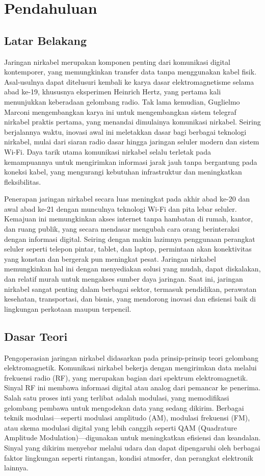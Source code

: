 \section{Pendahuluan}
\subsection{Latar Belakang}
Jaringan nirkabel merupakan komponen penting dari komunikasi 
digital kontemporer, yang memungkinkan transfer data tanpa 
menggunakan kabel fisik. Asal-usulnya dapat ditelusuri kembali 
ke karya dasar elektromagnetisme selama abad ke-19, khususnya 
eksperimen Heinrich Hertz, yang pertama kali menunjukkan 
keberadaan gelombang radio. Tak lama kemudian, Guglielmo Marconi 
mengembangkan karya ini untuk mengembangkan sistem telegraf 
nirkabel praktis pertama, yang menandai dimulainya komunikasi 
nirkabel. Seiring berjalannya waktu, inovasi awal ini meletakkan 
dasar bagi berbagai teknologi nirkabel, mulai dari siaran radio 
dasar hingga jaringan seluler modern dan sistem Wi-Fi. 
Daya tarik utama komunikasi nirkabel selalu terletak pada 
kemampuannya untuk mengirimkan informasi jarak jauh tanpa 
bergantung pada koneksi kabel, yang mengurangi kebutuhan 
infrastruktur dan meningkatkan fleksibilitas.

Penerapan jaringan nirkabel secara luas meningkat pada akhir 
abad ke-20 dan awal abad ke-21 dengan munculnya teknologi Wi-Fi 
dan pita lebar seluler. Kemajuan ini memungkinkan akses internet 
tanpa hambatan di rumah, kantor, dan ruang publik, yang secara 
mendasar mengubah cara orang berinteraksi dengan informasi 
digital. Seiring dengan makin lazimnya penggunaan perangkat 
seluler seperti telepon pintar, tablet, dan laptop, permintaan 
akan konektivitas yang konstan dan bergerak pun meningkat pesat. 
Jaringan nirkabel memungkinkan hal ini dengan menyediakan solusi 
yang mudah, dapat diskalakan, dan relatif murah untuk mengakses 
sumber daya jaringan. Saat ini, jaringan nirkabel sangat penting 
dalam berbagai sektor, termasuk pendidikan, perawatan kesehatan, 
transportasi, dan bisnis, yang mendorong inovasi dan efisiensi 
baik di lingkungan perkotaan maupun terpencil.
\subsection{Dasar Teori}
Pengoperasian jaringan nirkabel didasarkan pada prinsip-prinsip 
teori gelombang elektromagnetik. Komunikasi nirkabel bekerja 
dengan mengirimkan data melalui frekuensi radio (RF), yang 
merupakan bagian dari spektrum elektromagnetik. Sinyal RF ini 
membawa informasi digital atau analog dari pemancar ke penerima. 
Salah satu proses inti yang terlibat adalah modulasi, yang 
memodifikasi gelombang pembawa untuk mengodekan data yang sedang 
dikirim. Berbagai teknik modulasi—seperti modulasi amplitudo 
(AM), modulasi frekuensi (FM), atau skema modulasi digital yang 
lebih canggih seperti QAM (Quadrature Amplitude Modulation)—digunakan 
untuk meningkatkan efisiensi dan keandalan. Sinyal yang dikirim 
menyebar melalui udara dan dapat dipengaruhi oleh berbagai 
faktor lingkungan seperti rintangan, kondisi atmosfer, dan 
perangkat elektronik lainnya.

